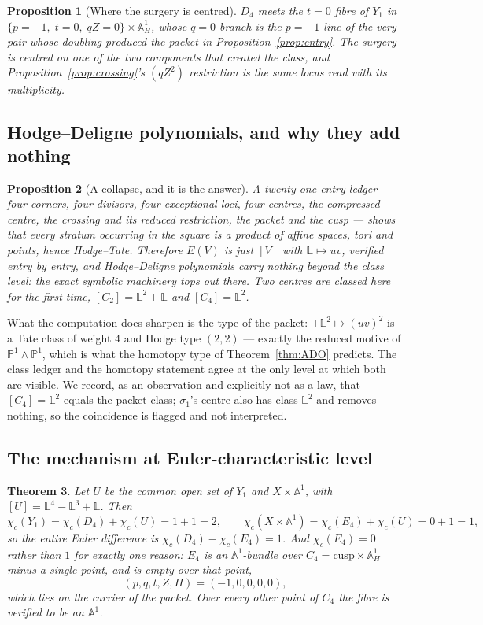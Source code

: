 \documentclass[11pt]{article}
\newtheorem{theorem}{Theorem}[section]
\newtheorem{proposition}[theorem]{Proposition}
\theoremstyle{definition}
\theoremstyle{remark}
\newcommand{\Aff}[1]{\mathbb{A}^{#1}}
\newcommand{\Lef}{\mathbb{L}}
\newcommand{\PP}{\mathbb{P}}
\newcommand{\chic}{\chi_c}
\begin{document}
\begin{proposition}[Where the surgery is centred]\label{prop:centred}
$D_4$ meets the $t=0$ fibre of $Y_1$ in $\{p=-1,\;t=0,\;qZ=0\}\times
\Aff{1}_H$, whose $q=0$ branch \emph{is} the $p=-1$ line of the very pair whose
doubling produced the packet in Proposition~\ref{prop:entry}. The surgery is
centred on one of the two components that created the class, and
Proposition~\ref{prop:crossing}'s $(qZ^2)$ restriction is the same locus read
with its multiplicity.
\end{proposition}

\subsection{Hodge--Deligne polynomials, and why they add nothing}

\begin{proposition}[A collapse, and it is the answer]\label{prop:epoly}
A twenty-one entry ledger --- four corners, four divisors, four exceptional
loci, four centres, the compressed centre, the crossing and its reduced
restriction, the packet and the cusp --- shows that every stratum occurring in
the square is a product of affine spaces, tori and points, hence Hodge--Tate.
Therefore $E(V)$ is just $[V]$ with $\Lef\mapsto uv$, verified entry by entry,
and Hodge--Deligne polynomials carry nothing beyond the class level: the exact
symbolic machinery tops out there. Two centres are classed here for the first
time, $[C_2]=\Lef^2+\Lef$ and $[C_4]=\Lef^2$.
\end{proposition}

What the computation does sharpen is the type of the packet: $+\Lef^2\mapsto
(uv)^2$ is a Tate class of weight $4$ and Hodge type $(2,2)$ --- exactly the
reduced motive of $\PP^1\wedge\PP^1$, which is what the homotopy type of
Theorem~\ref{thm:ADO} predicts. The class ledger and the homotopy statement
agree at the only level at which both are visible. We record, as an
observation and explicitly not as a law, that $[C_4]=\Lef^2$ equals the packet
class; $\sigma_1$'s centre also has class $\Lef^2$ and removes nothing, so the
coincidence is flagged and not interpreted.

\subsection{The mechanism at Euler-characteristic level}

\begin{theorem}\label{thm:mechanism}
Let $U$ be the common open set of $Y_1$ and $X\times\Aff{1}$, with
$[U]=\Lef^4-\Lef^3+\Lef$. Then
\[
\chic(Y_1)=\chic(D_4)+\chic(U)=1+1=2,\qquad
\chic(X\times\Aff{1})=\chic(E_4)+\chic(U)=0+1=1,
\]
so the entire Euler difference is $\chic(D_4)-\chic(E_4)=1$. And
$\chic(E_4)=0$ rather than $1$ for exactly one reason: $E_4$ is an
$\Aff{1}$-bundle over $C_4=\text{cusp}\times\Aff{1}_H$ \emph{minus a single
point}, and is empty over that point,
\[
(p,q,t,Z,H)=(-1,0,0,0,0),
\]
which lies on the carrier of the packet. Over every other point of $C_4$ the
fibre is verified to be an $\Aff{1}$.
\end{theorem}
\end{document}
